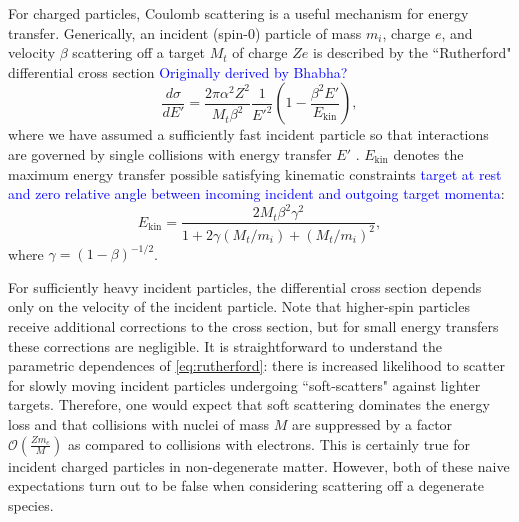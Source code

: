 \documentclass[twocolumn,showpacs,preprintnumbers,amsmath,amssymb,prd]{revtex4}
\newcommand{\OO}{\mathcal{O}}
\def\r{\right)}
\def\l{\left(}
\begin{document}
For charged particles, Coulomb scattering is a useful mechanism for energy transfer. Generically, an incident (spin-0) particle of mass $m_i$, charge $e$, and velocity $\beta$ scattering off a target $M_t$ of charge $Ze$ is described by the ``Rutherford" differential cross section \textcolor{blue}{Originally derived by Bhabha?}
\begin{equation}
\label{eq:rutherford}
\frac{d \sigma}{dE'} = \frac{2 \pi  \alpha^2 Z^2}{M_t \beta^2} \frac{1}{E'^2} \l1- \frac{\beta^2 E'}{E_{\text{kin}}}\r,
 \end{equation}
where we have assumed a sufficiently fast incident particle so that interactions are governed by single collisions with energy transfer $E'$ \cite{Agashe:2014kda}. $E_{\text{kin}}$ denotes the maximum energy transfer possible satisfying kinematic constraints \textcolor{blue}{target at rest and zero relative angle between incoming incident and outgoing target momenta}:
\begin{equation}
E_{\text{kin}} = \frac{2 M_t \beta^2 \gamma^2}{1+ 2\gamma(M_t/m_i) +(M_t/m_i)^2},
\end{equation}
where $\gamma = (1-\beta)^{-1/2}$.

For sufficiently heavy incident particles, the differential cross section depends only on the velocity of the incident particle. Note that higher-spin particles receive additional corrections to the cross section, but for small energy transfers these corrections are negligible. It is straightforward to understand the parametric dependences of \eqref{eq:rutherford}: there is increased likelihood to scatter for slowly moving incident particles undergoing ``soft-scatters" against lighter targets. Therefore, one would expect that soft scattering dominates the energy loss and that collisions with nuclei of mass $M$ are suppressed by a factor $\OO\l\frac{Z m_e}{M}\r$ as compared to collisions with electrons. This is certainly true for incident charged particles in non-degenerate matter. However, both of these naive expectations turn out to be false when considering scattering off a degenerate species.
\end{document}
